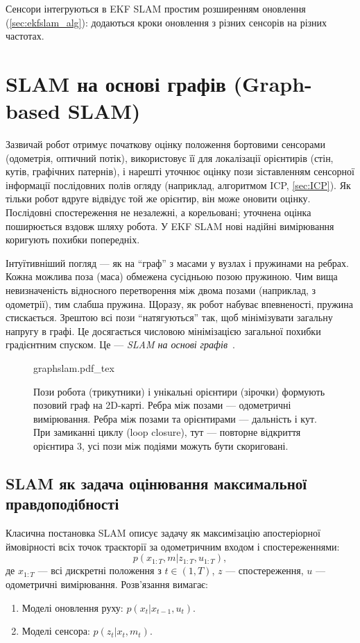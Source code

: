 Сенсори інтегруються в EKF SLAM простим розширенням оновлення (\cref{sec:ekfslam_alg}): додаються кроки оновлення з різних сенсорів на різних частотах.

\section{SLAM на основі графів (Graph-based SLAM)}
Зазвичай робот отримує початкову оцінку положення бортовими сенсорами (одометрія, оптичний потік), використовує її для локалізації орієнтирів (стін, кутів, графічних патернів), і нарешті уточнює оцінку пози зіставленням сенсорної інформації послідовних полів огляду (наприклад, алгоритмом ICP, \cref{sec:ICP}). Як тільки робот вдруге відвідує той же орієнтир, він може оновити оцінку. Послідовні спостереження не незалежні, а корельовані; уточнена оцінка поширюється вздовж шляху робота. У EKF SLAM нові надійні вимірювання коригують похибки попередніх.

Інтуїтивніший погляд — як на ``граф'' з масами у вузлах і пружинами на ребрах. Кожна можлива поза (маса) обмежена сусідньою позою пружиною. Чим вища невизначеність відносного перетворення між двома позами (наприклад, з одометрії), тим слабша пружина. Щоразу, як робот набуває впевненості, пружина стискається. Зрештою всі пози ``натягуються'' так, щоб мінімізувати загальну напругу в графі. Це досягається числовою мінімізацією загальної похибки градієнтним спуском. Це — \emph{SLAM на основі графів}~\cite{grisetti2010tutorial}.

\begin{figure}
\centering
    \def\svgwidth{0.6\textwidth}
    {graphslam.pdf_tex}
    \caption{Пози робота (трикутники) і унікальні орієнтири (зірочки) формують позовий граф на 2D-карті. Ребра між позами — одометричні вимірювання. Ребра між позами та орієнтирами — дальність і кут. При замиканні циклу (loop closure), тут — повторне відкриття орієнтира 3, усі пози між подіями можуть бути скориговані.}\label{fig:graphslam}
\end{figure}

\subsection{SLAM як задача оцінювання максимальної правдоподібності}
Класична постановка SLAM описує задачу як максимізацію апостеріорної ймовірності всіх точок траєкторії за одометричним входом і спостереженнями:
\begin{equation}
p(x_{1:T}, m | z_{1:T}, u_{1:T}),
\end{equation}
де $x_{1:T}$ — всі дискретні положення з $t \in (1, T)$, $z$ — спостереження, $u$ — одометричні вимірювання. Розв'язання вимагає:
\begin{enumerate}
\item Моделі оновлення руху: $p(x_t | x_{t-1}, u_t)$.
\item Моделі сенсора: $p(z_t | x_t, m_t)$.
\end{enumerate}


